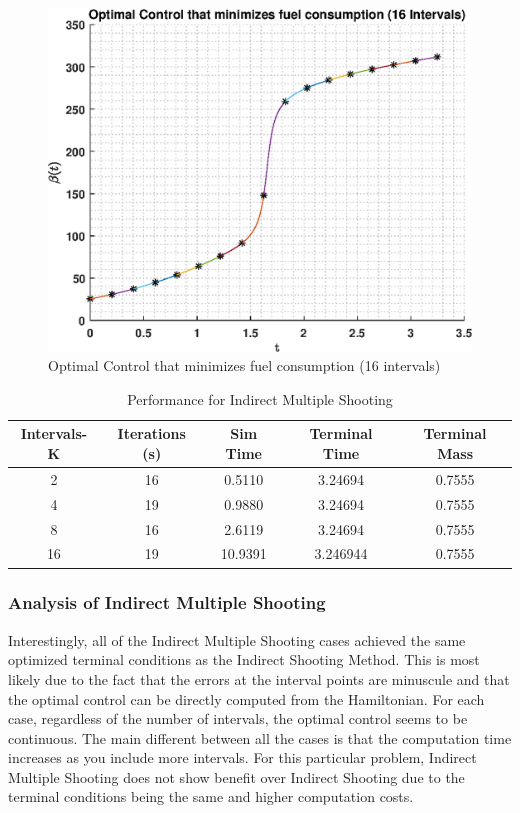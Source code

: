 \documentclass[]{article}
\begin{document}
\begin{figure}
	\centering
	\includegraphics[scale=0.75]{indirectMultiControl16.eps}
	\caption{Optimal Control that minimizes fuel consumption (16 intervals)}
	\label{fig:indirectMultiControl16}
\end{figure}
\begin{table}
    \centering
	\begin{tabular}{||c c c c c||} 
		\hline
		Intervals-K & Iterations (s) & Sim Time & Terminal Time & Terminal Mass\\ [0.5ex] 
		\hline\hline
		2           & 16            & 0.5110     &   3.24694      & 0.7555\\
		\hline
		4           & 19            & 0.9880     &   3.24694      & 0.7555\\ 
		\hline
		8           & 16            & 2.6119     &   3.24694      & 0.7555\\ 
		\hline
		16          & 19            & 10.9391    &   3.246944     & 0.7555\\ [1ex]
		\hline
	\end{tabular}
\caption{Performance for Indirect Multiple Shooting}
\label{table:2}
\end{table}

\subsubsection{Analysis of Indirect Multiple Shooting}
Interestingly, all of the Indirect Multiple Shooting cases achieved the same optimized terminal conditions as the Indirect Shooting Method. This is most likely due to the fact that the errors at the interval points are minuscule and that the optimal control can be directly computed from the Hamiltonian. For each case, regardless of the number of intervals, the optimal control seems to be continuous. The main different between all the cases is that the computation time increases as you include more intervals. For this particular problem, Indirect Multiple Shooting does not show benefit over Indirect Shooting due to the terminal conditions being the same and higher computation costs.
\FloatBarrier
\end{document}
